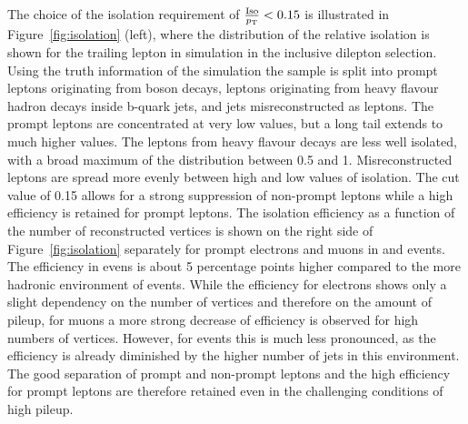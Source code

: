 The choice of the isolation requirement of $\frac{\text{Iso}}{p_{\mathrm{T}}}< 0.15$ is illustrated in Figure~\ref{fig:isolation} (left), where the distribution of the relative isolation is shown for the trailing lepton in \ttbar simulation in the inclusive dilepton selection. Using the truth information of the simulation the sample is split into prompt leptons originating from \W boson decays, leptons originating from heavy flavour hadron decays inside b-quark jets, and jets misreconstructed as leptons. The prompt leptons are concentrated at very low values, but a long tail extends to much higher values. The leptons from heavy flavour decays are less well isolated, with a broad maximum of the distribution between 0.5 and 1. Misreconstructed leptons are spread more evenly between high and low values of isolation. The cut value of 0.15 allows for a strong suppression of non-prompt leptons while a high efficiency is retained for prompt leptons. The isolation efficiency as a function of the number of reconstructed vertices is shown on the right side of Figure~\ref{fig:isolation} separately for prompt electrons and muons in \ttbar and \zjets events. The efficiency in \zjets evens is about 5 percentage points higher compared to the more hadronic environment of \ttbar events. While the efficiency for electrons shows only a slight dependency on the number of vertices and therefore on the amount of pileup, for muons a more strong decrease of efficiency is observed for high numbers of vertices. However, for \ttbar events this is much less pronounced, as the efficiency is already diminished by the higher number of jets in this environment. The good separation of prompt and non-prompt leptons and the high efficiency for prompt leptons are therefore  retained even in the challenging conditions of high pileup. 

